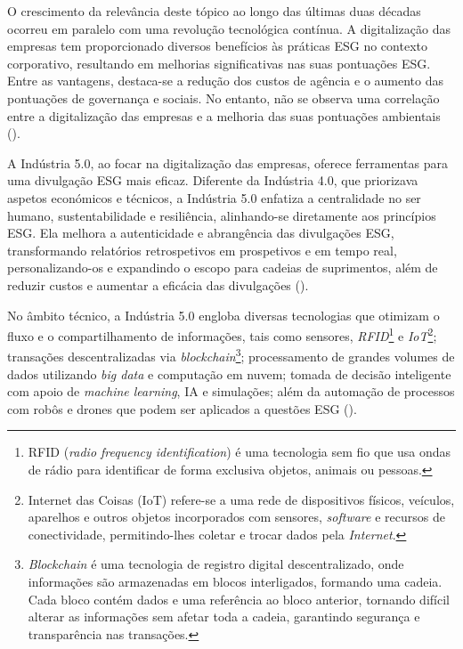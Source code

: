 O crescimento da relevância deste tópico ao longo das últimas duas décadas ocorreu em paralelo com uma revolução tecnológica contínua. A digitalização das empresas tem proporcionado diversos benefícios às práticas \gls{ESG} no contexto corporativo, resultando em melhorias significativas nas suas pontuações \gls{ESG}. Entre as vantagens, destaca-se a redução dos custos de agência e o aumento das pontuações de governança e sociais. No entanto, não se observa uma correlação entre a digitalização das empresas e a melhoria das suas pontuações ambientais (\cite{Fang2023}).

A Indústria 5.0, ao focar na digitalização das empresas, oferece ferramentas para uma divulgação \gls{ESG} mais eficaz. Diferente da Indústria 4.0, que priorizava aspetos económicos e técnicos, a Indústria 5.0 enfatiza a centralidade no ser humano, sustentabilidade e resiliência, alinhando-se diretamente aos princípios \gls{ESG}. Ela melhora a autenticidade e abrangência das divulgações \gls{ESG}, transformando relatórios retrospetivos em prospetivos e em tempo real, personalizando-os e expandindo o escopo para cadeias de suprimentos, além de reduzir custos e aumentar a eficácia das divulgações (\cite{Asif2023}).

No âmbito técnico, a Indústria 5.0 engloba diversas tecnologias que otimizam o fluxo e o compartilhamento de informações, tais como sensores, \textit{\gls{RFID}}\footnote{RFID (\textit{radio frequency identification}) é uma tecnologia sem fio que usa ondas de rádio para identificar de forma exclusiva objetos, animais ou pessoas.} e \textit{\gls{IoT}}\footnote{Internet das Coisas (IoT) refere-se a uma rede de dispositivos físicos, veículos, aparelhos e outros objetos incorporados com sensores, \textit{software} e recursos de conectividade, permitindo-lhes coletar e trocar dados pela \textit{Internet}.}; transações descentralizadas via \textit{blockchain}\footnote{\textit{Blockchain} é uma tecnologia de registro digital descentralizado, onde informações são armazenadas em blocos interligados, formando uma cadeia. Cada bloco contém dados e uma referência ao bloco anterior, tornando difícil alterar as informações sem afetar toda a cadeia, garantindo segurança e transparência nas transações.}; processamento de grandes volumes de dados utilizando \textit{big data} e computação em nuvem; tomada de decisão inteligente com apoio de \textit{machine learning}, \gls{IA} e simulações; além da automação de processos com robôs e drones que podem ser aplicados a questões \gls{ESG} (\cite{Asif2023}).

